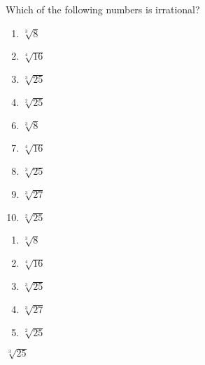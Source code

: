 


  Which of the following numbers is irrational?


\ifsat
	\begin{enumerate}[label=\Alph*)]
		\item    $\sqrt[3]{8}$
		\item  $\sqrt[4]{16}$ 
		\item $\sqrt[3]{25}$ %
		\item  $\sqrt[2]{25}$ 
	\end{enumerate}
\else
\fi

\ifacteven
	\begin{enumerate}[label=\textbf{\Alph*.},itemsep=\fill,align=left]
		\setcounter{enumii}{5}
		\item    $\sqrt[3]{8}$
		\item  $\sqrt[4]{16}$ 
		\item $\sqrt[3]{25}$ %
		\addtocounter{enumii}{1}
		\item $\sqrt[3]{27}$
		\item  $\sqrt[2]{25}$ 
	\end{enumerate}
\else
\fi

\ifactodd
	\begin{enumerate}[label=\textbf{\Alph*.},itemsep=\fill,align=left]
		\item    $\sqrt[3]{8}$
		\item  $\sqrt[4]{16}$ 
		\item $\sqrt[3]{25}$ %
		\item $\sqrt[3]{27}$
		\item  $\sqrt[2]{25}$ 
	\end{enumerate}
\else
\fi

\ifgridin
 $\sqrt[3]{25}$ %
		
\else
\fi

